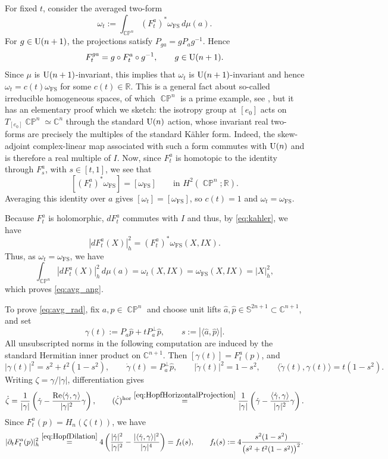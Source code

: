 \documentclass[11pt]{article}
\theoremstyle{plain}
\numberwithin{equation}{section}
\theoremstyle{definition}
\let\oldendproof\endproof
\renewenvironment{proof}[1][\proofname]{%
\oldproof[\upshape \bfseries #1]%
}{\oldendproof}
\def \R {\mathbb{R}}
\def \C{\mathbb{C}}
\def \mb{\mathbb}
\def \tp{\textup}
\def \FS{\mathrm{FS}}
\DeclareMathOperator{\CP}{\mathbb{CP}}
\begin{document}
\begin{proof}
For fixed $t$, consider the averaged two-form
\[
    \omega_t:=\int_{\CP^n}(F_t^a)^*\omega_{\FS}\,d\mu(a).
\]
For $g\in\tp{U}(n+1)$, the projections satisfy
$P_{ga}=gP_ag^{-1}$.  Hence
\begin{equation}
\label{eq:invF}
    F_t^{ga}=g\circ F_t^a\circ g^{-1},
    \qquad g\in\tp{U}(n+1).
\end{equation}
Since $\mu$ is $\tp{U}(n+1)$-invariant, this implies that $\omega_t$ is
$\tp{U}(n+1)$-invariant and hence $\omega_t=c(t)\omega_\FS$ for some $c(t)\in \R$. This is a general fact about so-called irreducible homogeneous spaces, of which $\CP^n$ is a prime example, see \cite[7.41-7.44]{Besse1987}, but it has an elementary proof which we sketch: the isotropy group at $[e_0]$ acts on
$T_{[e_0]}\CP^n\simeq\C^n$ through the standard $\tp{U}(n)$ action,
whose invariant real two-forms are precisely the multiples of the standard K\"ahler form.  Indeed, the skew-adjoint complex-linear map associated with such a form commutes with $\tp{U}(n)$ and is therefore a real multiple of $I$.
Now, since $F_t^a$ is
homotopic to the identity through $F_s^a$, with $s\in[t,1]$, we see that
\[
    [(F_t^a)^*\omega_{\FS}]=[\omega_{\FS}]
    \qquad\text{in }H^2(\CP^n;\R).
\]
Averaging this identity over $a$ gives
$[\omega_t]=[\omega_{\FS}]$, so $c(t)=1$ and $\omega_t=\omega_\FS$.

Because $F_t^a$ is holomorphic, $dF_t^a$ commutes with $I$ and thus, by
\eqref{eq:kahler}, we have
$$|d F_t^a(X)|_h^2= (F_t^a)^*\omega_\FS(X,IX).$$
Thus, as  $\omega_t=\omega_{\FS}$, we have
\[
    \int_{\CP^n}|dF_t^a(X)|_h^2\,d\mu(a)
    =\omega_t(X,IX)
    =\omega_{\FS}(X,IX)
    =|X|_h^2,
\]
which proves \eqref{eq:avg_ang}.

To prove \eqref{eq:avg_rad}, fix $a,p\in\CP^n$ and choose unit lifts
$\hat a,\hat p\in\mb S^{2n+1}\subset\C^{n+1}$, and set
\[
    \gamma(t):=P_a\hat p+tP_a^\perp\hat p,
    \qquad
    s:=|\langle\hat a,\hat p\rangle|.
\]
All unsubscripted norms in the following computation are induced by the
standard Hermitian inner product on $\C^{n+1}$.
Then $[\gamma(t)]=F_t^a(p)$, and
\[
    |\gamma(t)|^2=s^2+t^2(1-s^2),\qquad
    \dot\gamma(t)=P_a^\perp\hat p,\qquad
    |\dot\gamma(t)|^2=1-s^2,\qquad
    \langle\dot\gamma(t),\gamma(t)\rangle=t(1-s^2).
\]
Writing $\zeta=\gamma/|\gamma|$, differentiation gives
\[
    \dot\zeta
    =\frac1{|\gamma|}\left(
      \dot\gamma-
      \frac{\operatorname{Re}\langle\dot\gamma,\gamma\rangle}
           {|\gamma|^2}\gamma
    \right), \qquad 
    (\dot\zeta)^{\mathrm{hor}}
    \overset{\eqref{eq:HopfHorizontalProjection}}{=}\frac1{|\gamma|}
    \left(\dot\gamma
    -\frac{\langle\dot\gamma,\gamma\rangle}{|\gamma|^2}\gamma\right). 
\]
Since $F_t^a(p)=H_n(\zeta(t))$, we have
\[
    |\partial_tF_t^a(p)|_h^2
    \overset{\eqref{eq:HopfDilation}}{=}4\left(
      \frac{|\dot\gamma|^2}{|\gamma|^2}
      -\frac{|\langle\dot\gamma,\gamma\rangle|^2}{|\gamma|^4}    \right)=f_t(s),
    \qquad
    f_t(s):=4\frac{s^2(1-s^2)}
    {\bigl(s^2+t^2(1-s^2)\bigr)^2}.
\]


\end{proof}
\end{document}
